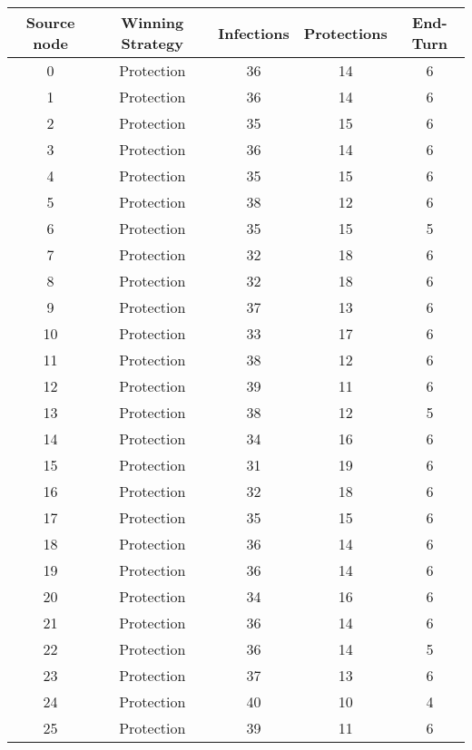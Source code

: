 \documentclass[results.tex]{subfiles}
\begin{document}
\begin{center}
  \begin{tabular}{| c || c | c | c | c |}
    \hline
    {\bfseries Source node} & {\bfseries Winning Strategy} & {\bfseries Infections} & {\bfseries Protections} & {\bfseries End-Turn} \\  %
    \hline\hline
    0 & Protection & 36 & 14 & 6 \\ 
    \hline
    1 & Protection & 36 & 14 & 6 \\ 
    \hline
    2 & Protection & 35 & 15 & 6 \\ 
    \hline
    3 & Protection & 36 & 14 & 6 \\ 
    \hline
    4 & Protection & 35 & 15 & 6 \\ 
    \hline
    5 & Protection & 38 & 12 & 6 \\ 
    \hline
    6 & Protection & 35 & 15 & 5 \\ 
    \hline
    7 & Protection & 32 & 18 & 6 \\ 
    \hline
    8 & Protection & 32 & 18 & 6 \\ 
    \hline
    9 & Protection & 37 & 13 & 6 \\ 
    \hline
    10 & Protection & 33 & 17 & 6 \\ 
    \hline
    11 & Protection & 38 & 12 & 6 \\ 
    \hline
    12 & Protection & 39 & 11 & 6 \\ 
    \hline
    13 & Protection & 38 & 12 & 5 \\ 
    \hline
    14 & Protection & 34 & 16 & 6 \\ 
    \hline
    15 & Protection & 31 & 19 & 6 \\ 
    \hline
    16 & Protection & 32 & 18 & 6 \\ 
    \hline
    17 & Protection & 35 & 15 & 6 \\ 
    \hline
    18 & Protection & 36 & 14 & 6 \\ 
    \hline
    19 & Protection & 36 & 14 & 6 \\ 
    \hline
    20 & Protection & 34 & 16 & 6 \\ 
    \hline
    21 & Protection & 36 & 14 & 6 \\ 
    \hline
    22 & Protection & 36 & 14 & 5 \\ 
    \hline
    23 & Protection & 37 & 13 & 6 \\ 
    \hline
    24 & Protection & 40 & 10 & 4 \\ 
    \hline
    25 & Protection & 39 & 11 & 6 \\ 

\end{tabular}
\end{center}
\end{document}
